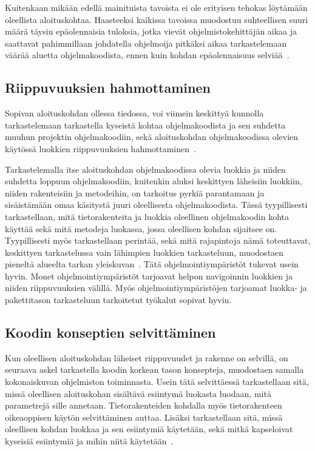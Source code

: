 \documentclass[finnish]{../tktltiki2}
\theoremstyle{definition}
\theoremstyle{remark}
\begin{document}
Kuitenkaan mikään edellä mainituista tavoista ei ole erityisen tehokas löytämään oleellista aloituskohtaa. Haasteeksi kaikissa tavoissa muodostuu suhteellisen suuri määrä täysin epäolennaisia tuloksia, jotka vievät ohjelmistokehittäjän aikaa ja saattavat pahimmillaan johdatella ohjelmoija pitkäksi aikaa tarkastelemaan väärää aluetta ohjelmakoodista, ennen kuin kohdan epäolennaisuus selviää~\cite{eliciting-design-requirements-for-maintenance-oriented-ides}.

\subsection{Riippuvuuksien hahmottaminen}
Sopivan aloituskohdan ollessa tiedossa, voi viimein keskittyä kunnolla tarkastelemaan tarkastella kyseistä kohtaa ohjelmakoodista ja sen suhdetta muuhun projektin ohjelmakoodiin, sekä aloituskohdan ohjelmakoodissa olevien käytössä luokkien riippuvuuksien hahmottaminen~\cite{questions-during-software-evolution-tasks}. %

Tarkastelemalla itse aloituskohdan ohjelmakoodissa olevia luokkia ja niiden suhdetta loppuun ohjelmakoodiin, kuitenkin aluksi keskittyen läheisiin luokkiin, niiden rakenteisiin ja metodeihin, on tarkoitus pyrkiä parantamaan ja sisäistämään omaa käsitystä juuri oleellisesta ohjelmakoodista. Tässä tyypillisesti tarkastellaan, mitä tietorakenteita ja luokkia oleellinen ohjelmakoodin kohta käyttää sekä mitä metodeja luokassa, jossa oleellisen kohdan sijaitsee on. Tyypillisesti myös tarkastellaan perintää, sekä mitä rajapintoja nämä toteuttavat, keskittyen tarkastelussa vain lähimpien luokkien tarkasteluun, muodostaen pieneltä alueelta tarkan yleiskuvan~\cite{questions-during-software-evolution-tasks}.
Tätä ohjelmointiympäristöt tukevat usein hyvin. Monet ohjelmointiympäristöt tarjoavat helpon navigoinnin luokkien ja niiden riippuvuuksien välillä. Myös ohjelmointiympäristöjen tarjoamat luokka- ja pakettitason tarkasteluun tarkoitetut työkalut sopivat hyvin.

\subsection{Koodin konseptien selvittäminen}
Kun oleellisen aloituskohdan läheiset riippuvuudet ja rakenne on selvillä, on seuraava askel tarkastella koodin korkean tason konsepteja, muodostaen samalla kokonaiskuvan ohjelmiston toiminnasta. Usein tätä selvittäessä tarkastellaan sitä, missä oleellisen aloituskohan sisältävä esiintymä luokasta luodaan, mitä parametrejä sille annetaan. Tietorakenteiden kohdalla myös tietorakenteen oikeaoppisen käytön selvittäminen auttaa. Lisäksi tarkastellaan sitä, missä oleellisen kohdan luokkaa ja sen esiintymiä käytetään, sekä mitkä kapseloivat kyseisiä esiintymiä ja mihin niitä käytetään~\cite{questions-during-software-evolution-tasks,eliciting-design-requirements-for-maintenance-oriented-ides}.
\end{document}
